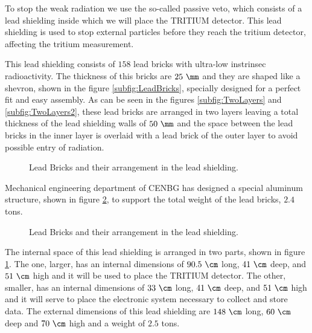 To stop the weak radiation we use the so-called passive veto, which consists of a lead shielding inside which we will place the TRITIUM detector. This lead shielding is used to stop external particles before they reach the tritium detector, affecting the tritium measurement.

This lead shielding consists of $158$ lead bricks with ultra-low instrinsec radioactivity. The thickness of this bricks are $25~\mm$ and they are shaped like a shevron, shown in the figure \ref{subfig:LeadBricks}, specially designed for a perfect fit and easy assembly. As can be seen in the figures \ref{subfig:TwoLayers} and \ref{subfig:TwoLayers2}, these lead bricks are arranged in two layers leaving a total thickness of the lead shielding walls of $50~\mm$ and the space between the lead bricks in the inner layer is overlaid with a lead brick of the outer layer to avoid possible entry of radiation.

\begin{figure}[htbp]
 \centering
 \caption{Lead Bricks and their arrangement in the lead shielding.}
 \label{fig:LeadBricksAndArrangement}
\end{figure}

Mechanical engineering department of CENBG has designed a special aluminum structure, shown in figure \ref{fig:AluminiumStructure}, to support the total weight of the lead bricks, $2.4$ tons.

\begin{figure}[htbp]
 \centering
    \caption{Lead Bricks and their arrangement in the lead shielding.}
 \label{fig:AluminiumStructure}
\end{figure}

The internal space of this lead shielding is arranged in two parts, shown in figure \ref{fig:LeadBricksAndArrangement}. The one, larger, has an internal dimensions of $90.5~\cm$ long, $41~\cm$ deep, and $51~\cm$ high and it will be used to place the TRITIUM detector. The other, smaller, has an internal dimensions of $33~\cm$ long, $41~\cm$ deep, and $51~\cm$ high and it will serve to place the electronic system necessary to collect and store data. The external dimensions of this lead shielding are $148~\cm$ long, $60~\cm$ deep and $70~\cm$ high and a weight of $2.5$ tons.

